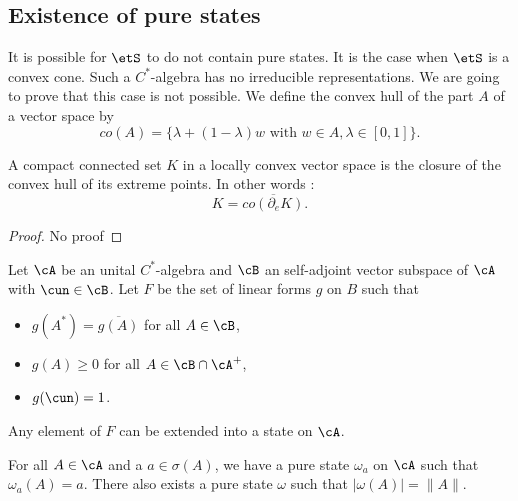 \subsection{Existence of pure states}

It is possible for $\etS$ to do not contain pure states. It is the case when $\etS$ is a convex cone. Such a $C^*$-algebra  has no irreducible representations. We are going to prove that this case is not possible. We define the convex hull of the part $A$ of a vector space by
\[ 
  co(A)=\{ \lambda+(1-\lambda)w\text{ with }w\in A,\lambda\in[0,1] \}.
\]



\begin{theorem}
 A compact connected set $K$ in a locally convex vector space is the closure of the convex hull of its extreme points. In other words :
    \[ 
  K=\overline{ co(\partial_eK) }.
\]

\end{theorem}
\begin{proof}
No proof
\end{proof}


\begin{lemma}

 Let $\cA$ be an unital $C^*$-algebra  and $\cB$ an self-adjoint vector subspace of $\cA$ with $\cun\in\cB$. Let $F$ be the set of linear forms $g$ on $B$ such that


\begin{itemize}
\item  $g(A^*) = \overline{g(A)}$ for all $A\in\cB$,
 \item $g(A) \geq 0$ for all $A\in \cB\cap \cA^+$,
\item $g(\cun)=1$.
\end{itemize}
 Any element of $F$ can be extended into a state on $\cA$.
\label{lem_DixcBprol}
 \end{lemma}

\begin{theorem}  
For all $A\in\cA$ and a $a\in\sigma(A)$, we have a pure state $\omega_a$ on $\cA$ such that $\omega_a(A)=a$. There also exists a pure state $\omega$ such that $| \omega(A) |=\| A \|$.
\label{tho_existsetat}
\end{theorem}

